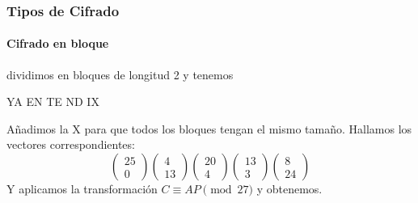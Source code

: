 \documentclass[spanish, mexico]{beamer}
\begin{document}
	\begin{frame}
		\frametitle{Tipos de Cifrado}
		\framesubtitle{Cifrado en bloque}
		 \begin{solution}
		    dividimos en bloques de longitud 2 y tenemos
		    \begin{center}
		        YA EN TE ND IX
		    \end{center}
		    Añadimos la X para que todos los bloques tengan el mismo tamaño. Hallamos los vectores correspondientes:
		    $$
		        \begin{pmatrix}25\\0\end{pmatrix} \begin{pmatrix}4\\13\end{pmatrix}
		        \begin{pmatrix}20\\4\end{pmatrix} \begin{pmatrix}13\\3\end{pmatrix}
		        \begin{pmatrix}8\\24\end{pmatrix}
		    $$
		    Y aplicamos la transformación $C \equiv AP \pmod{27}$ y obtenemos.
		 \end{solution}
	\end{frame}
	
\end{document}
